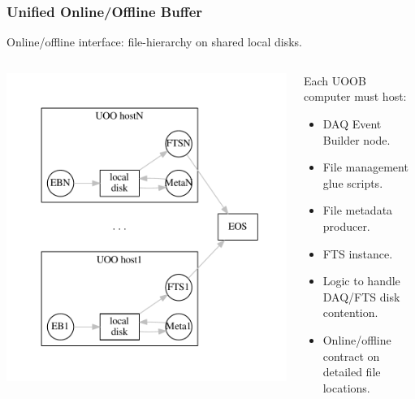 \documentclass[xcolor=dvipsnames]{beamer}
\begin{document}
\begin{frame}
  \frametitle{Unified Online/Offline Buffer}

  Online/offline interface: file-hierarchy on shared local disks.  

  \begin{columns}
    \begin{column}{0.4\textwidth}
      \includegraphics[width=\textwidth,clip,trim=5mm 0 5mm 0]{figures/uoob-join.pdf}
    \end{column}
    \begin{column}{0.6\textwidth}
      Each UOOB computer must host:
      \begin{itemize}\footnotesize
      \item DAQ Event Builder node.
      \item File management glue scripts.
      \item File metadata producer.
      \item FTS instance.
      \item Logic to handle DAQ/FTS disk contention.
      \item Online/offline contract on detailed file locations.
      \end{itemize}
    \end{column}
  \end{columns}
\end{frame}
\end{document}
